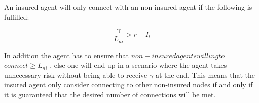 An insured agent will only connect with an non-insured agent if the following is fulfilled:

\begin{equation}
\frac{\gamma}{ L_{ni}}  > r +  I_{l}
\label{eq:gammaovernotinsured}
\end{equation}

In addition the agent has to ensure that $non-insured $\:$ agents $\:$ willing $\:$ to $\:$ connect \ge L_{ni}$ , else one will end up in a scenario where the agent takes unnecessary risk without being able to receive $\gamma$ at the end. This means that the insured agent only consider connecting to other non-insured nodes if and only if it is guaranteed that the desired number of connections will be met. 

